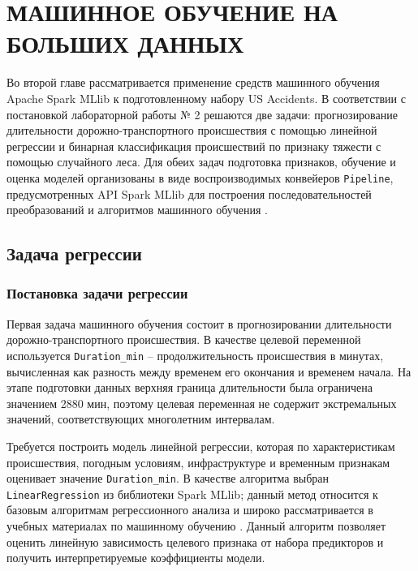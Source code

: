 %
\chapter{\MakeUppercase{Машинное обучение на больших данных}}\label{ch:second}


\vspace{\baselineskip}
Во второй главе рассматривается применение средств машинного обучения Apache Spark MLlib к подготовленному набору US Accidents. В соответствии с постановкой лабораторной работы № 2 решаются две задачи: прогнозирование длительности дорожно-транспортного происшествия с помощью линейной регрессии и бинарная классификация происшествий по признаку тяжести с помощью случайного леса. Для обеих задач подготовка признаков, обучение и оценка моделей организованы в виде воспроизводимых конвейеров \texttt{Pipeline}, предусмотренных API Spark MLlib для построения последовательностей преобразований и алгоритмов машинного обучения \cite{spark352mllib, spark352pyspark}.

\vspace{\baselineskip}
\section{Задача регрессии}

\subsection{Постановка задачи регрессии}\vspace{\baselineskip}

Первая задача машинного обучения состоит в прогнозировании длительности дорожно-транспортного происшествия. В качестве целевой переменной используется \texttt{Duration\_min} -- продолжительность происшествия в минутах, вычисленная как разность между временем его окончания и временем начала. На этапе подготовки данных верхняя граница длительности была ограничена значением 2880 мин, поэтому целевая переменная не содержит экстремальных значений, соответствующих многолетним интервалам.

Требуется построить модель линейной регрессии, которая по характеристикам происшествия, погодным условиям, инфраструктуре и временным признакам оценивает значение \texttt{Duration\_min}. В качестве алгоритма выбран \texttt{LinearRegression} из библиотеки Spark MLlib; данный метод относится к базовым алгоритмам регрессионного анализа и широко рассматривается в учебных материалах по машинному обучению \cite{spark352mllib, yandex2024ml}. Данный алгоритм позволяет оценить линейную зависимость целевого признака от набора предикторов и получить интерпретируемые коэффициенты модели.

